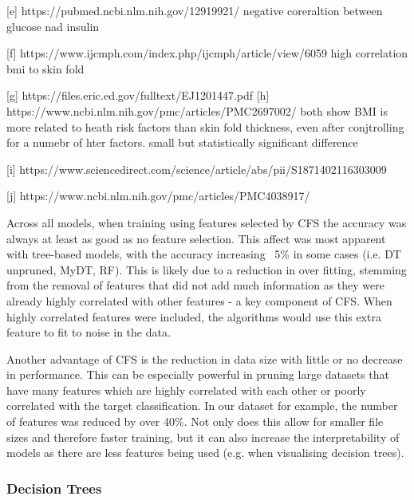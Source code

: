 [e] https://pubmed.ncbi.nlm.nih.gov/12919921/
negative coreraltion between glucose nad insulin

[f] https://www.ijcmph.com/index.php/ijcmph/article/view/6059
high correlation bmi to skin fold

[g] https://files.eric.ed.gov/fulltext/EJ1201447.pdf
[h] https://www.ncbi.nlm.nih.gov/pmc/articles/PMC2697002/
both show BMI is more related to heath risk factors than skin fold thickness, even after conjtrolling for a numebr of hter factors. small but statistically significant difference

[i] https://www.sciencedirect.com/science/article/abs/pii/S1871402116303009

[j] https://www.ncbi.nlm.nih.gov/pmc/articles/PMC4038917/





Across all models, when training using features selected by CFS the accuracy was always at least as good as no feature selection. This affect was most apparent with tree-based models, with the accuracy increasing ~5\% in some cases (i.e. DT unpruned, MyDT, RF). This is likely due to a reduction in over fitting, stemming from the removal of features that did not add much information as they were already highly correlated with other features - a key component of CFS. When highly correlated features were included, the algorithms would use this extra feature to fit to noise in the data.

Another advantage of CFS is the reduction in data size with little or no decrease in performance. This can be especially powerful in pruning large datasets that have many features which are highly correlated with each other  or poorly correlated with the target classification. In our dataset for example, the number of features was reduced by over 40\%. Not only does this allow for smaller file sizes and therefore faster training, but it can also increase the interpretability of models as there are less features being used (e.g. when visualising decision trees).



\subsubsection{Decision Trees}


